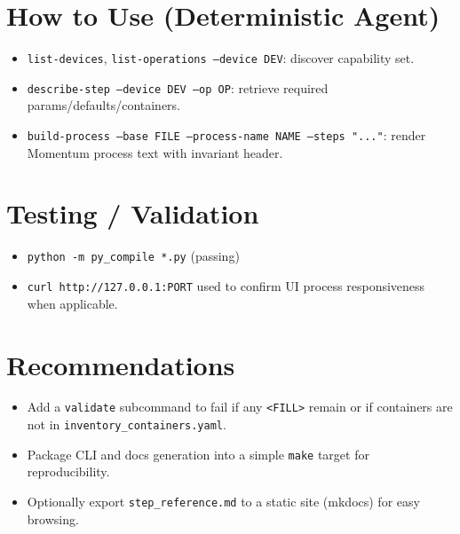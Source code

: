 \documentclass[11pt]{article}
\begin{document}
\section{How to Use (Deterministic Agent)}
\begin{itemize}[leftmargin=*]
  \item \texttt{list-devices}, \texttt{list-operations --device DEV}: discover capability set.
  \item \texttt{describe-step --device DEV --op OP}: retrieve required params/defaults/containers.
  \item \texttt{build-process --base FILE --process-name NAME --steps "..."}: render Momentum process text with invariant header.
\end{itemize}

\section{Testing / Validation}
\begin{itemize}[leftmargin=*]
  \item \texttt{python -m py\_compile *.py} (passing)
  \item \texttt{curl http://127.0.0.1:PORT} used to confirm UI process responsiveness when applicable.
\end{itemize}

\section{Recommendations}
\begin{itemize}[leftmargin=*]
  \item Add a \texttt{validate} subcommand to fail if any \texttt{<FILL>} remain or if containers are not in \texttt{inventory\_containers.yaml}.
  \item Package CLI and docs generation into a simple \texttt{make} target for reproducibility.
  \item Optionally export \texttt{step\_reference.md} to a static site (mkdocs) for easy browsing.
\end{itemize}
\end{document}
